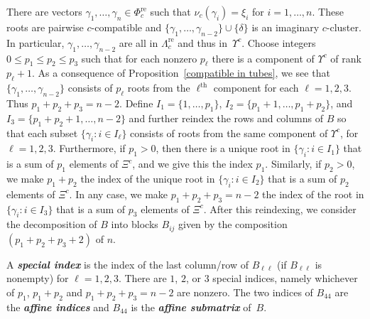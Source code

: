 \documentclass[10pt]{article}
\theoremstyle{definition}
\theoremstyle{remark}
\numberwithin{equation}{section}
\newcommand{\newword}[1]{\textbf{\emph{#1}}}
\newcommand{\set}[1]{{\lbrace #1 \rbrace}}
\renewcommand{\th}{^\text{th}}
\newcommand{\0}{{\mathbf{0}}}
\newcommand{\re}{\mathrm{re}}
\renewcommand{\th}{^\text{th}}
\newcommand{\RSChar}{\Phi}
\newcommand{\RS}{\RSChar}
\newcommand{\RSTChar}{\Upsilon}
\newcommand{\RST}[1]{\RSTChar^{#1}}
\newcommand{\SimplesTChar}{\Xi}
\newcommand{\SimplesT}[1]{\SimplesTChar^{#1}}
\newcommand{\AP}[1]{\RS_{#1}}
\newcommand{\APre}[1]{\AP{#1}^\re}
\newcommand{\APTChar}{\Lambda}
\newcommand{\APT}[1]{\APTChar_{#1}}
\newcommand{\APTre}[1]{\APT{#1}^\re}
\begin{document}
There are vectors $\gamma_1,\ldots,\gamma_n\in\APre{c}$ such that $\nu_c(\gamma_i)=\xi_i$ for $i=1,\ldots,n$.
These roots are pairwise $c$-compatible and $\set{\gamma_1,\ldots,\gamma_{n-2}}\cup\set{\delta}$ is an imaginary $c$-cluster.
In particular,  $\gamma_1,\ldots,\gamma_{n-2}$ are all in $\APTre{c}$ and thus in~$\RST{c}$.
Choose integers ${0\leq p_1\leq p_2 \leq p_3}$ such that for each nonzero $p_\ell$ there is a component of $\RST{c}$ of rank $p_\ell+1$.
As a consequence of Proposition~\ref{compatible in tubes}, we see that $\set{\gamma_1,\ldots,\gamma_{n-2}}$ consists of $p_\ell$ roots from the $\ell\th$ component for each $\ell=1,2,3$.
Thus ${p_1+p_2+p_3=n-2}$.
Define $I_1=\set{1,\ldots,p_1}$, $I_2=\set{p_1+1,\ldots,p_1+p_2}$, and $I_3=\set{p_1+p_2+1,\ldots,n-2}$ and further reindex the rows and columns of $B$ so that each subset $\set{\gamma_i:i\in I_\ell}$  consists of roots from the same component of $\RST{c}$, for $\ell=1,2,3$.
Furthermore, if $p_1>0$, then there is a unique root in $\set{\gamma_i:i\in I_1}$ that is a sum of $p_1$ elements of $\SimplesT{c}$, and we give this the index $p_1$.
Similarly, if $p_2>0$, we make $p_1+p_2$ the index of the unique root in $\set{\gamma_i:i\in I_2}$ that is a sum of $p_2$ elements of $\SimplesT{c}$.
In any case, we make $p_1+p_2+p_3=n-2$ the index of the root in $\set{\gamma_i:i\in I_3}$ that is a sum of $p_3$ elements of $\SimplesT{c}$.
After this reindexing, we consider the decomposition of $B$ into blocks $B_{ij}$ given by the composition $(p_1+p_2+p_3+2)$ of $n$.

A \newword{special index} is the index of the last column/row of $B_{\ell\ell}$ (if $B_{\ell\ell}$ is nonempty) for $\ell=1,2,3$.
There are $1$, $2$, or $3$ special indices, namely whichever of $p_1$, $p_1+p_2$ and $p_1+p_2+p_3=n-2$ are nonzero.
The two indices of $B_{44}$ are the \newword{affine indices} and $B_{44}$ is the \newword{affine submatrix} of~$B$.
\end{document}
